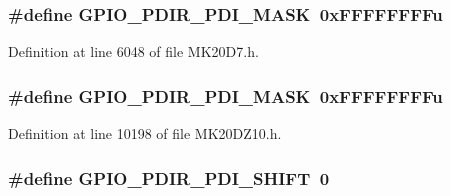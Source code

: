 \subsubsection[{\texorpdfstring{G\+P\+I\+O\+\_\+\+P\+D\+I\+R\+\_\+\+P\+D\+I\+\_\+\+M\+A\+SK}{GPIO_PDIR_PDI_MASK}}]{\setlength{\rightskip}{0pt plus 5cm}\#define G\+P\+I\+O\+\_\+\+P\+D\+I\+R\+\_\+\+P\+D\+I\+\_\+\+M\+A\+SK~0x\+F\+F\+F\+F\+F\+F\+F\+Fu}\hypertarget{group___g_p_i_o___register___masks_gacb7c8cc976937906c8e803811a7fbb68}{}\label{group___g_p_i_o___register___masks_gacb7c8cc976937906c8e803811a7fbb68}


Definition at line 6048 of file M\+K20\+D7.\+h.

\subsubsection[{\texorpdfstring{G\+P\+I\+O\+\_\+\+P\+D\+I\+R\+\_\+\+P\+D\+I\+\_\+\+M\+A\+SK}{GPIO_PDIR_PDI_MASK}}]{\setlength{\rightskip}{0pt plus 5cm}\#define G\+P\+I\+O\+\_\+\+P\+D\+I\+R\+\_\+\+P\+D\+I\+\_\+\+M\+A\+SK~0x\+F\+F\+F\+F\+F\+F\+F\+Fu}\hypertarget{group___g_p_i_o___register___masks_gacb7c8cc976937906c8e803811a7fbb68}{}\label{group___g_p_i_o___register___masks_gacb7c8cc976937906c8e803811a7fbb68}


Definition at line 10198 of file M\+K20\+D\+Z10.\+h.

\subsubsection[{\texorpdfstring{G\+P\+I\+O\+\_\+\+P\+D\+I\+R\+\_\+\+P\+D\+I\+\_\+\+S\+H\+I\+FT}{GPIO_PDIR_PDI_SHIFT}}]{\setlength{\rightskip}{0pt plus 5cm}\#define G\+P\+I\+O\+\_\+\+P\+D\+I\+R\+\_\+\+P\+D\+I\+\_\+\+S\+H\+I\+FT~0}\hypertarget{group___g_p_i_o___register___masks_ga99fd9212dd769bb1964a28a864c6c741}{}\label{group___g_p_i_o___register___masks_ga99fd9212dd769bb1964a28a864c6c741}



